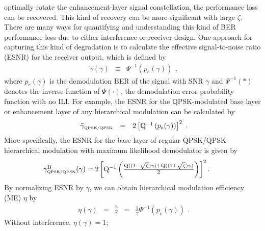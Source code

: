 \documentclass[10pt,fleqn, twocolumn]{IEEEtran}
\begin{document}
optimally rotate the enhancement-layer signal constellation, the
performance loss can be recovered. This kind of recovery can be
more significant with large $\zeta$. There are many ways for
quantifying and understanding this kind of BER performance loss
due to either interference or receiver design. One approach for
capturing this kind of degradation is to calculate the effective
signal-to-noise ratio (ESNR) for the receiver output, which is
defined by
\begin{equation}
\begin{array}{rcl}
\tilde{\gamma}\left(\gamma\right)&\equiv&\Psi^{-1}\left(p_{e}(\gamma)\right)
\end{array},\label{eff_SNR}
\end{equation}
\noindent where $p_{e}(\gamma)$ is the demodulation BER of the
signal with SNR $\gamma$ and $\Psi^{-1}\left(\ast\right)$ denotes
the inverse function of $\Psi\left(\cdot\right)$, the demodulation
error probability function with no ILI. For example, the ESNR for
the QPSK-modulated base layer or enhancement layer of any
hierarchical modulation can be calculated by
\begin{equation}
\begin{array}{rcl}
\tilde{\gamma}_{\mbox{\tiny QPSK/QPSK}}&=&2\left[{\rm
Q}^{-1}\left(p_{e}(\gamma)\right)\right]^2
\end{array}.\label{eff_SNR_QPSK}
\end{equation}
\noindent More specifically, the ESNR for the base layer of
regular QPSK/QPSK hierarchical modulation with maximum likelihood
demodulator is given by
\begin{equation}\hspace{-0.225in}
\begin{array}{l}
\tilde{\gamma}_{\mbox{\tiny QPSK/QPSK}}^{\rm
B}(\gamma)=2\left[{\rm Q}^{-1}\left(\frac{{\rm
Q}((1-\sqrt{\zeta})\gamma)+{\rm
Q}((1+\sqrt{\zeta})\gamma)}{2}\right)\right]^2.
\end{array}\label{eff_SNR_QPSK_QPSK}
\end{equation}
\noindent By normalizing ESNR by $\gamma$, we can obtain
hierarchical modulation efficiency (ME) $\eta$ by
\begin{equation}
\begin{array}{rcccl}
\eta\left(\gamma\right)&=&\frac{\tilde{\gamma}}{\gamma}&=&\frac{1}{\gamma}\Psi^{-1}\left(p_{e}(\gamma)\right)
\end{array}.\label{mod_eff}
\end{equation}
\noindent Without interference, $\eta\left(\gamma\right)=1$;
\end{document}
